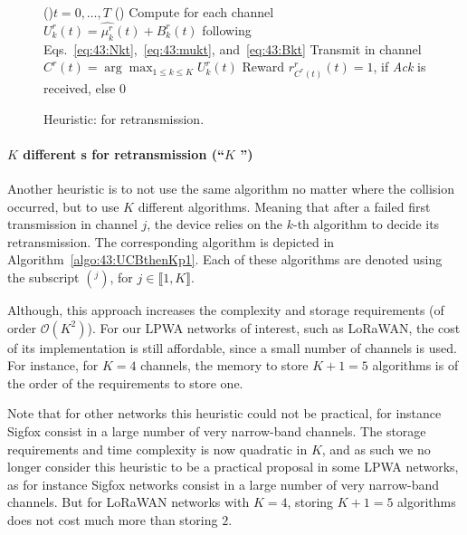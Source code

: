 \vspace*{-3pt}
\begin{figure}[h!]
	\centering
	\begin{algorithm}[H]
		\For(){$t = 0, \dots, T$}{
			\Else(){
				Compute for each channel $U^r_k(t) = \widehat{\mu^r_k}(t) + B^r_k(t)$ following Eqs.~\eqref{eq:43:Nkt},~\eqref{eq:43:mukt}, and~\eqref{eq:43:Bkt}\;
				Transmit in channel $C^r(t) = \arg\max_{1\leq k \leq K} U^r_k(t)$\;
				Reward $r^r_{C^r(t)}(t) = 1$, if \emph{Ack} is received, else $0$\;
			}
		}
		\caption{Heuristic: \UCB{} for retransmission.}    %
		\label{algo:43:TwoUCB}
		\end{algorithm}
\end{figure}

\paragraph{$K$ different {\UCB}s for retransmission (``$K$ \UCB{}'')}\label{sub:43:UCBthenKp1}

Another heuristic is to not use the same algorithm no matter where the collision occurred, but to use $K$ different \UCB{} algorithms.
Meaning that after a failed first transmission in channel $j$, the device relies on the $k$-th algorithm to decide its retransmission.
The corresponding algorithm is depicted in Algorithm~\ref{algo:43:UCBthenKp1}.
Each of these algorithms are denoted using the subscript $({}^{j})$, for $j\in\llbracket 1, K \rrbracket$.

Although, this approach increases the complexity and storage requirements (of order $\mathcal{O}(K^2)$).
For our LPWA networks of interest, such as LoRaWAN, the cost of its implementation is still affordable, since a small number of channels is used.
For instance, for $K=4$ channels,
the memory to store $K+1=5$ algorithms is of the order of the requirements to store one.

Note that for other networks this heuristic could not be practical, for instance Sigfox consist in a large number of very narrow-band channels.
The storage requirements and time complexity is now quadratic in $K$, and as such we no longer consider this heuristic to be a practical proposal in some LPWA networks, as for instance Sigfox networks consist in a large number of very narrow-band channels. But for LoRaWAN networks with $K=4$, storing $K+1=5$ algorithms does not cost much more than storing $2$.


